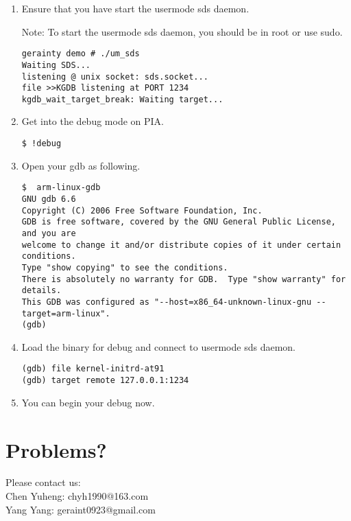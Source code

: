 \documentclass[a4paper]{article}
\begin{document}
\begin{enumerate}
\item Ensure that you have start the usermode sds daemon.

Note: To start the usermode sds daemon, you should be in root or use sudo.
\begin{verbatim}
gerainty demo # ./um_sds 
Waiting SDS...
listening @ unix socket: sds.socket...
file >>KGDB listening at PORT 1234
kgdb_wait_target_break: Waiting target...
\end{verbatim}

\item Get into the debug mode on PIA.


\begin{verbatim}
$ !debug
\end{verbatim}

\item Open your gdb as following.

{
\footnotesize
\begin{verbatim}
$  arm-linux-gdb
GNU gdb 6.6
Copyright (C) 2006 Free Software Foundation, Inc.
GDB is free software, covered by the GNU General Public License, and you are
welcome to change it and/or distribute copies of it under certain conditions.
Type "show copying" to see the conditions.
There is absolutely no warranty for GDB.  Type "show warranty" for details.
This GDB was configured as "--host=x86_64-unknown-linux-gnu --target=arm-linux".
(gdb) 
\end{verbatim}

}
\item Load the binary for debug and connect to usermode sds daemon.

\begin{verbatim}
(gdb) file kernel-initrd-at91
(gdb) target remote 127.0.0.1:1234
\end{verbatim}

\item You can begin your debug now.

\end{enumerate}

\section{Problems?}
Please contact us: \\
Chen Yuheng: chyh1990@163.com\\
Yang Yang: geraint0923@gmail.com
\end{document}

